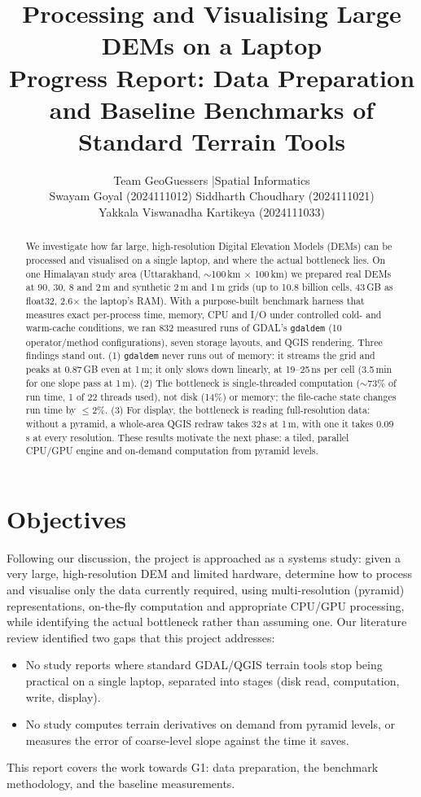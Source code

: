 ﻿\documentclass[11pt,a4paper]{article}
\title{\textbf{Processing and Visualising Large DEMs on a Laptop}\\[4pt]
\large Progress Report: Data Preparation and Baseline Benchmarks of Standard Terrain Tools}
\author{Team GeoGuessers \quad|\quad Spatial Informatics\\[4pt]
Swayam Goyal (2024111012) \quad Siddharth Choudhary (2024111021)\\
Yakkala Viswanadha Kartikeya (2024111033)}
\date{}
\begin{document}
\maketitle

\begin{abstract}
\noindent
We investigate how far large, high-resolution Digital Elevation Models (DEMs) can be processed and visualised on a
single laptop, and where the actual bottleneck lies. On one Himalayan study area (Uttarakhand, $\sim$100\,km
$\times$ 100\,km) we prepared real DEMs at 90, 30, 8 and 2\,m and synthetic 2\,m and 1\,m grids (up to 10.8 billion
cells, 43\,GB as float32, 2.6$\times$ the laptop's RAM). With a purpose-built benchmark harness that measures exact
per-process time, memory, CPU and I/O under controlled cold- and warm-cache conditions, we ran 832 measured runs of
GDAL's \texttt{gdaldem} (10 operator/method configurations), seven storage layouts, and QGIS rendering. Three findings
stand out. (1) \texttt{gdaldem} never runs out of memory: it streams the grid and peaks at 0.87\,GB even at 1\,m; it
only slows down linearly, at 19--25\,ns per cell (3.5\,min for one slope pass at 1\,m). (2) The bottleneck is
single-threaded computation ($\sim$73\% of run time, 1 of 22 threads used), not disk (14\%) or memory; the file-cache
state changes run time by $\le$2\%. (3) For display, the bottleneck is reading full-resolution data: without a
pyramid, a whole-area QGIS redraw takes 32\,s at 1\,m, with one it takes 0.09\,s at every resolution. These results
motivate the next phase: a tiled, parallel CPU/GPU engine and on-demand computation from pyramid levels.
\end{abstract}

\section{Objectives}
Following our discussion, the project is approached as a systems study: given a very large, high-resolution DEM and
limited hardware, determine how to process and visualise only the data currently required, using multi-resolution
(pyramid) representations, on-the-fly computation and appropriate CPU/GPU processing, while identifying the actual
bottleneck rather than assuming one. Our literature review identified two gaps that this project addresses:
\begin{itemize}
  \item[\textbf{G1}] No study reports where standard GDAL/QGIS terrain tools stop being practical on a single laptop,
  separated into stages (disk read, computation, write, display).
  \item[\textbf{G2}] No study computes terrain derivatives on demand from pyramid levels, or measures the error of
  coarse-level slope against the time it saves.
\end{itemize}
This report covers the work towards G1: data preparation, the benchmark methodology, and the baseline measurements.
\end{document}
